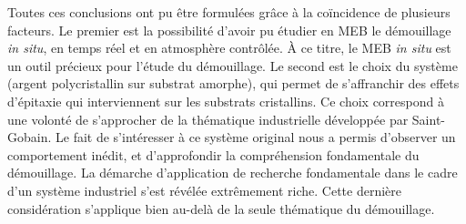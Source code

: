 Toutes ces conclusions ont pu être formulées grâce à la coïncidence de plusieurs facteurs. Le premier est la possibilité d'avoir pu étudier en MEB le démouillage \textit{in situ}, en temps réel et en atmosphère contrôlée. À ce titre, le MEB \textit{in situ} est un outil précieux pour l'étude du démouillage. Le second est le choix du système (argent polycristallin sur substrat amorphe), qui permet de s'affranchir des effets d'épitaxie qui interviennent sur les substrats cristallins. Ce choix correspond à une volonté de s'approcher de la thématique industrielle développée par Saint-Gobain. Le fait de s'intéresser à ce système original nous a permis d'observer un comportement inédit, et d'approfondir la compréhension fondamentale du démouillage. La démarche d'application de recherche fondamentale dans le cadre d'un système industriel s'est révélée extrêmement riche. Cette dernière considération s'applique bien au-delà de la seule thématique du démouillage.\par 

\newpage



